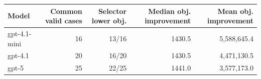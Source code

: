 \begin{tabular}{lrrrr}
\toprule
\textbf{Model} & \textbf{Common valid cases} & \textbf{Selector lower obj.} & \textbf{Median obj. improvement} & \textbf{Mean obj. improvement} \\
\midrule
gpt-4.1-mini & 16 & 13/16 & 1430.5 & 5{,}588{,}645.4 \\
gpt-4.1 & 20 & 16/20 & 1430.5 & 4{,}471{,}130.5 \\
gpt-5 & 25 & 22/25 & 1441.0 & 3{,}577{,}173.0 \\
\bottomrule
\end{tabular}
